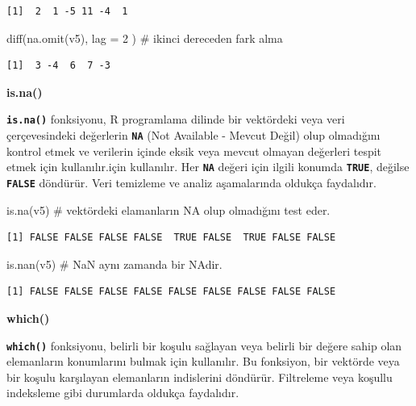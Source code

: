 \documentclass[
  letterpaper,
  DIV=11,
  numbers=noendperiod]{scrreprt}
\newenvironment{Shaded}{\begin{snugshade}}{\end{snugshade}}
\newcommand{\AttributeTok}[1]{\textcolor[rgb]{0.40,0.45,0.13}{#1}}
\newcommand{\CommentTok}[1]{\textcolor[rgb]{0.37,0.37,0.37}{#1}}
\newcommand{\DecValTok}[1]{\textcolor[rgb]{0.68,0.00,0.00}{#1}}
\newcommand{\FunctionTok}[1]{\textcolor[rgb]{0.28,0.35,0.67}{#1}}
\newcommand{\NormalTok}[1]{\textcolor[rgb]{0.00,0.23,0.31}{#1}}
\begin{document}
\begin{verbatim}
[1]  2  1 -5 11 -4  1
\end{verbatim}

\begin{Shaded}
\begin{Highlighting}[]
\FunctionTok{diff}\NormalTok{(}\FunctionTok{na.omit}\NormalTok{(v5), }\AttributeTok{lag =} \DecValTok{2}\NormalTok{ ) }\CommentTok{\# ikinci dereceden fark alma}
\end{Highlighting}
\end{Shaded}

\begin{verbatim}
[1]  3 -4  6  7 -3
\end{verbatim}

\textbf{is.na()}

\textbf{\texttt{is.na()}} fonksiyonu, R programlama dilinde bir
vektördeki veya veri çerçevesindeki değerlerin \textbf{\texttt{NA}} (Not
Available - Mevcut Değil) olup olmadığını kontrol etmek ve verilerin
içinde eksik veya mevcut olmayan değerleri tespit etmek için
kullanılır.için kullanılır. Her \textbf{\texttt{NA}} değeri için ilgili
konumda \textbf{\texttt{TRUE}}, değilse \textbf{\texttt{FALSE}}
döndürür. Veri temizleme ve analiz aşamalarında oldukça faydalıdır.

\begin{Shaded}
\begin{Highlighting}[]
\FunctionTok{is.na}\NormalTok{(v5) }\CommentTok{\# vektördeki elamanların NA olup olmadığını test eder.}
\end{Highlighting}
\end{Shaded}

\begin{verbatim}
[1] FALSE FALSE FALSE FALSE  TRUE FALSE  TRUE FALSE FALSE
\end{verbatim}

\begin{Shaded}
\begin{Highlighting}[]
\FunctionTok{is.nan}\NormalTok{(v5) }\CommentTok{\# NaN aynı zamanda bir NA\textquotesingle{}dir.}
\end{Highlighting}
\end{Shaded}

\begin{verbatim}
[1] FALSE FALSE FALSE FALSE FALSE FALSE FALSE FALSE FALSE
\end{verbatim}

\textbf{which()}

\textbf{\texttt{which()}} fonksiyonu, belirli bir koşulu sağlayan veya
belirli bir değere sahip olan elemanların konumlarını bulmak için
kullanılır. Bu fonksiyon, bir vektörde veya bir koşulu karşılayan
elemanların indislerini döndürür. Filtreleme veya koşullu indeksleme
gibi durumlarda oldukça faydalıdır.
\end{document}
